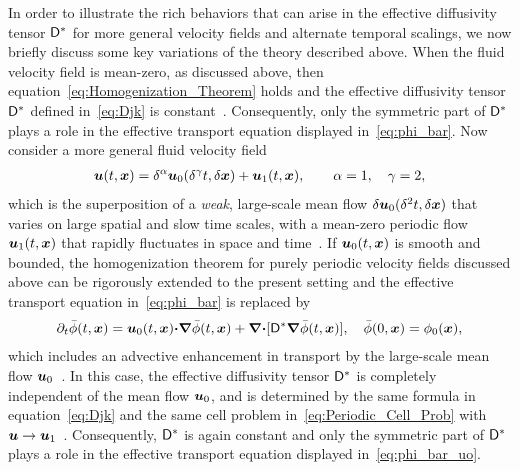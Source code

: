 \documentclass[amsa]{ipart}
\begin{document}
In order to illustrate the rich behaviors that can arise in the effective
diffusivity tensor $\mathsf{D}^*$ for more general velocity fields and
alternate temporal scalings, we now briefly discuss some key variations
of the theory described above. When the 
fluid velocity field is mean-zero, as discussed above, then
equation~\eqref{eq:Homogenization_Theorem} holds and the effective
diffusivity tensor $\mathsf{D}^*$ defined in~\eqref{eq:Djk} is
constant~\cite{Majda:Kramer:1999:book}. Consequently, only the
symmetric part of $\mathsf{D}^*$ plays a role in the effective transport
equation displayed in~\eqref{eq:phi_bar}. Now consider a more general
fluid velocity field
%
\begin{align}\label{eq:Velocity_field_uo_u1}
  \vecu(t,\vecx)=\delta^\alpha\vecu_0(\delta^\gamma t,\delta\vecx)+\vecu_1(t,\vecx),
  \qquad
  \alpha=1, \quad
  \gamma=2,
\end{align}
%
which is the superposition of a \emph{weak}, large-scale mean flow
$\delta\boldsymbol{u}_0(\delta^2t,\delta\boldsymbol{x})$ that varies on large spatial and slow time
scales, with a mean-zero periodic flow $\boldsymbol{u}_1(t,\boldsymbol{x})$ that rapidly
fluctuates in space and time~\cite{Majda:Kramer:1999:book}.
If $\boldsymbol{u}_0(t,\boldsymbol{x})$ is smooth and bounded, the homogenization
theorem for purely periodic velocity fields discussed above can be
rigorously extended to the present setting and the effective transport
equation in~\eqref{eq:phi_bar} is replaced
by~\cite{Majda:Kramer:1999:book}   
%
\begin{align}\label{eq:phi_bar_uo}
  \partial_t\bar{\phi}(t,\vecx)=\vecu_0(t,\vecx)\bcdot\bnabla\bar{\phi}(t,\vecx)
                   +\bnabla\bcdot[\Dm^*\bnabla\bar{\phi}(t,\vecx)],
  \quad 
  \bar{\phi}(0,\vecx)=\phi_0(\vecx),
\end{align}
%
which includes an advective enhancement in transport by the
large-scale mean flow $\boldsymbol{u}_0$~\cite{Majda:Kramer:1999:book}. In this
case, the effective diffusivity tensor $\mathsf{D}^*$ is completely
independent of the mean flow $\boldsymbol{u}_0$, and is determined by the same
formula in equation~\eqref{eq:Djk} and the same cell problem
in~\eqref{eq:Periodic_Cell_Prob} with
$\boldsymbol{u}\to\boldsymbol{u}_1$~\cite{Majda:Kramer:1999:book}. Consequently, $\mathsf{D}^*$
is again constant and only the symmetric part of $\mathsf{D}^*$ plays
a role in the effective transport equation displayed
in~\eqref{eq:phi_bar_uo}.
\end{document}
